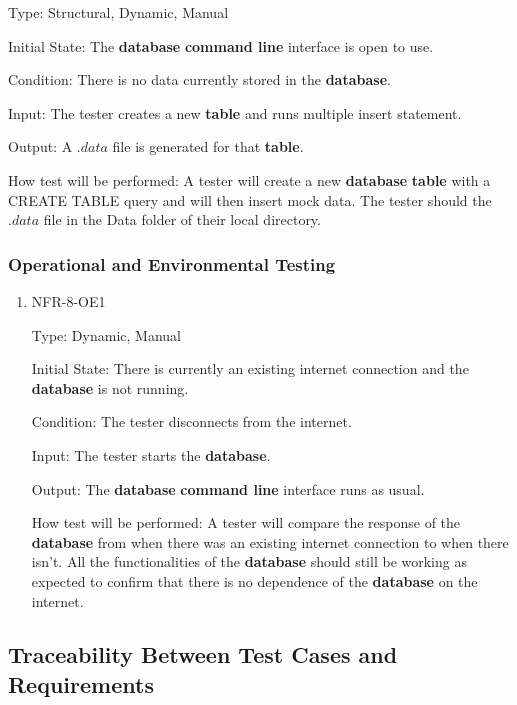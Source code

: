 \documentclass[12pt, titlepage]{article}
\begin{document}
\begin{enumerate}
    Type: Structural, Dynamic, Manual
    
    Initial State: The \textbf{database} \textbf{command line} interface is open to use. 
    
    Condition: There is no data currently stored in the \textbf{database}. 
    
    Input: The tester creates a new \textbf{table} and runs multiple insert statement.
    
    Output: A $.data$ file is generated for that \textbf{table}. 
    
    How test will be performed: A tester will create a new \textbf{database} \textbf{table} with a CREATE TABLE query and will then insert mock data. The tester should the $.data$ file in the Data folder of their local directory.     
     
\end{enumerate}

\subsubsection{Operational and Environmental Testing}

\begin{enumerate}
    \item{NFR-8-OE1\\}
    
    Type: Dynamic, Manual
    
    Initial State: There is currently an existing internet connection and the \textbf{database} is not running. 
    
    Condition: The tester disconnects from the internet.
    
    Input: The tester starts the \textbf{database}. 
    
    Output: The \textbf{database} \textbf{command line} interface runs as usual. 
    
    How test will be performed: A tester will compare the response of the \textbf{database} from when there was an existing internet connection to when there isn't. All the functionalities of the \textbf{database} should still be working as expected to confirm that there is no dependence of the \textbf{database} on the internet. 
    
\end{enumerate}

\subsection{Traceability Between Test Cases and Requirements}
\end{document}
